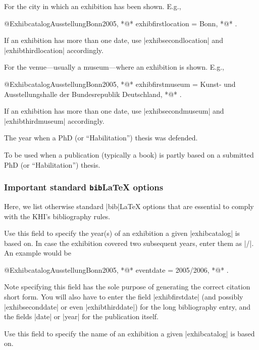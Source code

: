 \documentclass[a4paper,
10pt,
ngerman,
english
]{ltxdoc}
\begin{document}
For the city in which an exhibition has been shown. E.g.,
\begin{code}
@Exhibcatalog{AusstellungBonn2005,
  *@\ldots@*
  exhibfirstlocation = {Bonn},
  *@\ldots@*
}.
\end{code}
If an exhibition has more than one date, use |exhibsecondlocation| and |exhibthirdlocation| accordingly.

For the venue---usually a museum---where an exhibition is shown. E.g.,
\begin{code}
@Exhibcatalog{AusstellungBonn2005,
  *@\ldots@*
  exhibfirstmuseum = {Kunst- und Ausstellungshalle der Bundesrepublik Deutschland},
  *@\ldots@*
}.
\end{code}
If an exhibition has more than one date, use |exhibsecondmuseum| and |exhibthirdmuseum| accordingly.

The year when a PhD (or \enquote{Habilitation}) thesis was defended.

To be used when a publication (typically a book) is partly based on a submitted PhD (or \enquote{Habilitation}) thesis.


\subsubsection{Important standard \texttt{bib}\LaTeX{} options}\label{sec:bibl-efields}
Here, we list otherwise standard |bib|\LaTeX{} options that are essential to comply with the KHI's bibliography rules.

Use this field to specify the year(s) of an exhibition a given |exhibcatalog| is based on. In case the exhibition covered two subsequent years, enter them as |/|. An example would be
\begin{code}
@Exhibcatalog{AusstellungBonn2005,
  *@\ldots@*
  eventdate = {2005/2006},
  *@\ldots@*
}.
\end{code}
Note specifying this field has the sole purpose of generating the correct citation short form.
You will also have to enter the field |exhibfirstdate| (and possibly |exhibseconddate| or even |exhibthirddate|) for the long bibliography entry, and the fields |date| or |year| for the publication itself. 

Use this field to specify the name of an exhibition a given |exhibcatalog| is based on.
\end{document}
